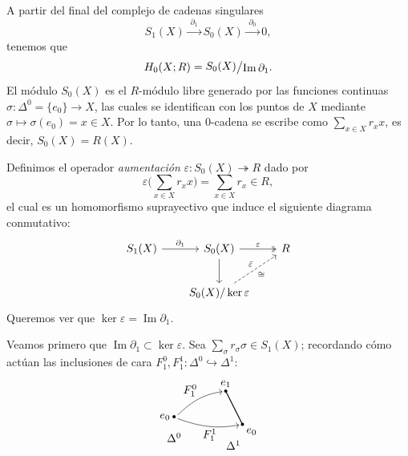\begin{dem}
A partir del final del complejo de cadenas singulares
\[
S_1(X) \xrightarrow{\;\partial_1\;} S_0(X) \xrightarrow{\;\partial_0\;} 0,
\]
tenemos que
\[
H_0(X; R) = \raisebox{0.2ex}{$S_0(X)$} \big/ \raisebox{-0.2ex}{$\operatorname{Im} \partial_1$}.
\]
El módulo $S_0(X)$ es el $R$-módulo libre generado por las funciones continuas $\sigma \colon \Delta^0 = \{e_0\} \to X$, las cuales se identifican con los puntos de $X$ mediante $\sigma \longmapsto \sigma(e_0) = x \in X$. Por lo tanto, una $0$-cadena se escribe como $\sum_{x \in X} r_x x$, es decir, $S_0(X) = R(X)$.

Definimos el operador \textit{aumentación} $\varepsilon \colon S_0(X) \twoheadrightarrow R$ dado por
\[
\varepsilon\Big(\sum_{x \in X} r_x x\Big) = \sum_{x \in X} r_x \in R,
\]
el cual es un homomorfismo suprayectivo que induce el siguiente diagrama conmutativo:
\[
\begin{tikzcd}[column sep=2em, row sep=2.2em]
S_1(X) \arrow[r, "\partial_1"] & S_0(X) \arrow[r, two heads, "\varepsilon"] \arrow[d] & R \\
& S_0(X)/\ker \varepsilon \arrow[ur, dashed, "\bar{\varepsilon}", "\cong"'] &
\end{tikzcd}
\]
Queremos ver que $\ker \varepsilon = \operatorname{Im} \partial_1$.




Veamos primero que $\operatorname{Im} \partial_1 \subset \ker \varepsilon$. Sea $\sum_\sigma r_\sigma \sigma \in S_1(X)$; recordando cómo actúan las inclusiones de cara $F_1^0, F_1^1 \colon \Delta^0 \hookrightarrow \Delta^1$:
\[
\begin{tikzpicture}[baseline=(current bounding box.center), scale=0.95]
    \coordinate (D0) at (0, 0.5);
    \coordinate (E1) at (1.7, 1.35);
    \coordinate (E0) at (2.25, 0.25);

    \fill (D0) circle (1.5pt) node[left] {$e_0$};
    \node[below] at (0, 0.1) {$\Delta^0$};

    \draw[thick] (E1) -- (E0);
    \fill (E1) circle (1.5pt) node[above] {$e_1$};
    \fill (E0) circle (1.5pt) node[below right] {$e_0$};
    \node[below] at (1.95, -0.15) {$\Delta^1$};

    \draw[->, shorten >=3pt] (0.12, 0.56) to[bend left=18] node[above left, inner sep=2pt] {$F_1^0$} (E1);
    \draw[->, shorten >=3pt] (0.12, 0.44) to[bend right=15] node[below, inner sep=2pt] {$F_1^1$} (E0);


\end{tikzpicture}\]
\end{dem}
